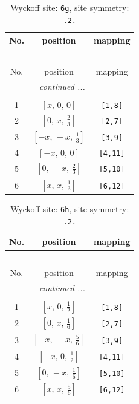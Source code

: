 \documentclass[fleqn,8pt]{jsarticle}
\begin{document}
\renewcommand{\arraystretch}{1.2}
\begin{longtable}{ccc}
\caption{Wyckoff site: {\tt 6g}, site symmetry: {\tt .2.}}
 \\
 \hline \hline
No. & position & mapping \\ \hline \endfirsthead

\multicolumn{2}{l}{\tablename\ \thetable{}} \\
 \hline \hline
No. & position & mapping \\ \hline \endhead

 \hline \hline
\multicolumn{2}{r}{\footnotesize\it continued ...} \\ \endfoot

 \hline \hline
\multicolumn{2}{r}{} \\ \endlastfoot

1 & $\left[ x,\, 0,\, 0 \right]$ & {\tt [1,8]} \\ \hline
2 & $\left[ 0,\, x,\, \frac{2}{3} \right]$ & {\tt [2,7]} \\ \hline
3 & $\left[ - x,\, - x,\, \frac{1}{3} \right]$ & {\tt [3,9]} \\ \hline
4 & $\left[ - x,\, 0,\, 0 \right]$ & {\tt [4,11]} \\ \hline
5 & $\left[ 0,\, - x,\, \frac{2}{3} \right]$ & {\tt [5,10]} \\ \hline
6 & $\left[ x,\, x,\, \frac{1}{3} \right]$ & {\tt [6,12]} \\
\end{longtable}
\renewcommand{\arraystretch}{1.2}
\begin{longtable}{ccc}
\caption{Wyckoff site: {\tt 6h}, site symmetry: {\tt .2.}}
 \\
 \hline \hline
No. & position & mapping \\ \hline \endfirsthead

\multicolumn{2}{l}{\tablename\ \thetable{}} \\
 \hline \hline
No. & position & mapping \\ \hline \endhead

 \hline \hline
\multicolumn{2}{r}{\footnotesize\it continued ...} \\ \endfoot

 \hline \hline
\multicolumn{2}{r}{} \\ \endlastfoot

1 & $\left[ x,\, 0,\, \frac{1}{2} \right]$ & {\tt [1,8]} \\ \hline
2 & $\left[ 0,\, x,\, \frac{1}{6} \right]$ & {\tt [2,7]} \\ \hline
3 & $\left[ - x,\, - x,\, \frac{5}{6} \right]$ & {\tt [3,9]} \\ \hline
4 & $\left[ - x,\, 0,\, \frac{1}{2} \right]$ & {\tt [4,11]} \\ \hline
5 & $\left[ 0,\, - x,\, \frac{1}{6} \right]$ & {\tt [5,10]} \\ \hline
6 & $\left[ x,\, x,\, \frac{5}{6} \right]$ & {\tt [6,12]} \\
\end{longtable}
\end{document}
